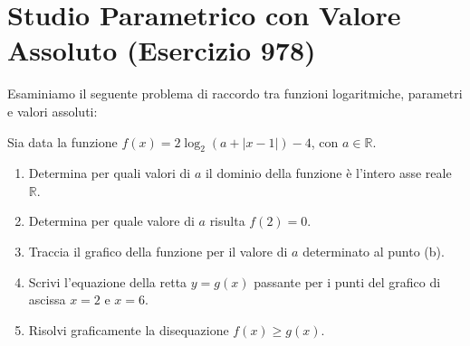 \documentclass[11pt,a4paper,oneside]{report}
\begin{document}
\section{Studio Parametrico con Valore Assoluto (Esercizio 978)}
Esaminiamo il seguente problema di raccordo tra funzioni logaritmiche, parametri e valori assoluti:

\begin{esercizio}
Sia data la funzione $f(x) = 2\log_2(a + |x - 1|) - 4$, con $a \in \mathbb{R}$.
\begin{enumerate}[label=\alph*.]
    \item Determina per quali valori di $a$ il dominio della funzione è l'intero asse reale $\mathbb{R}$.
    \item Determina per quale valore di $a$ risulta $f(2) = 0$.
    \item Traccia il grafico della funzione per il valore di $a$ determinato al punto (b).
    \item Scrivi l'equazione della retta $y = g(x)$ passante per i punti del grafico di ascissa $x = 2$ e $x = 6$.
    \item Risolvi graficamente la disequazione $f(x) \ge g(x)$.
\end{enumerate}
\end{esercizio}
\end{document}
